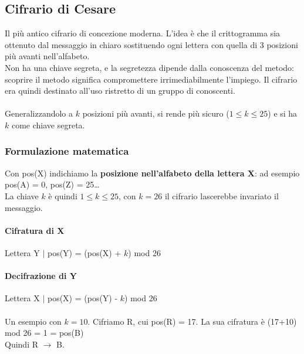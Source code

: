 \documentclass[10pt]{book}
\begin{document}
\subsection{Cifrario di Cesare}
Il più antico cifrario di concezione moderna. L'idea è che il crittogramma sia ottenuto dal messaggio in chiaro sostituendo ogni lettera con quella di $3$ posizioni più avanti nell'alfabeto.\\
Non ha una chiave segreta, e la segretezza dipende dalla conoscenza del metodo: scoprire il metodo significa compromettere irrimediabilmente l'impiego. Il cifrario era quindi destinato all'uso ristretto di un gruppo di conoscenti.\\\\
Generalizzandolo a $k$ posizioni più avanti, si rende più sicuro ($1\leq k \leq 25$) e si ha $k$ come chiave segreta.
\subsubsection{Formulazione matematica}
Con pos(X) indichiamo la \textbf{posizione nell'alfabeto della lettera X}: ad esempio pos(A) = 0, pos(Z) = 25\ldots\\
La chiave $k$ è quindi $1 \leq k \leq 25$, con $k=26$ il cifrario lascerebbe invariato il messaggio.
\paragraph{Cifratura di X} Lettera Y $|$ pos(Y) = (pos(X) + $k$) mod 26
\paragraph{Decifrazione di Y} Lettera X $|$ pos(X) = (pos(Y) - $k$) mod 26\\\\
Un esempio con $k=10$. Cifriamo R, cui pos(R) = 17. La sua cifratura è (17+10) mod 26 = 1 = pos(B)\\Quindi R $\rightarrow$ B.
\end{document}
